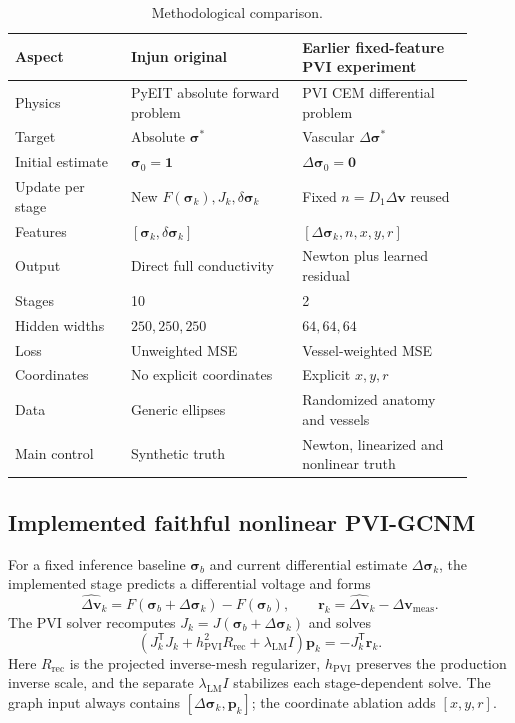 \documentclass[11pt]{article}
\newcommand{\trans}{^{\mathsf T}}
\newcommand{\sig}{\bm{\sigma}}
\newcommand{\dv}{\Delta\bm{v}}
\newcommand{\dsig}{\Delta\bm{\sigma}}
\begin{document}
\begin{table}[H]
\centering
\caption{Methodological comparison.}
\label{tab:method-comparison}
\small
\begin{tabular}{@{}p{0.23\linewidth}p{0.34\linewidth}p{0.34\linewidth}@{}}
\toprule
Aspect & Injun original & Earlier fixed-feature PVI experiment \\
\midrule
Physics & PyEIT absolute forward problem & PVI CEM differential problem \\
Target & Absolute $\sig^*$ & Vascular $\dsig^*$ \\
Initial estimate & $\sig_0=\bm1$ & $\dsig_0=\bm0$ \\
Update per stage & New $F(\sig_k),J_k,\delta\sig_k$ & Fixed $n=D_1\dv$ reused \\
Features & $[\sig_k,\delta\sig_k]$ & $[\dsig_k,n,x,y,r]$ \\
Output & Direct full conductivity & Newton plus learned residual \\
Stages & 10 & 2 \\
Hidden widths & $250,250,250$ & $64,64,64$ \\
Loss & Unweighted MSE & Vessel-weighted MSE \\
Coordinates & No explicit coordinates & Explicit $x,y,r$ \\
Data & Generic ellipses & Randomized anatomy and vessels \\
Main control & Synthetic truth & Newton, linearized and nonlinear truth \\
\bottomrule
\end{tabular}
\end{table}

\subsection{Implemented faithful nonlinear PVI-GCNM}
\label{sec:faithful-implementation}

For a fixed inference baseline $\sig_b$ and current differential estimate
$\dsig_k$, the implemented stage predicts a differential voltage and forms
\begin{equation}
  \widehat{\dv}_k=F(\sig_b+\dsig_k)-F(\sig_b),
  \qquad \bm r_k=\widehat{\dv}_k-\dv_{\mathrm{meas}}.
  \label{eq:implemented-residual}
\end{equation}
The PVI solver recomputes $J_k=J(\sig_b+\dsig_k)$ and solves
\begin{equation}
  \left(J_k\trans J_k+h_{\mathrm{PVI}}^2R_{\mathrm{rec}}
  +\lambda_{\mathrm{LM}}I\right)\bm p_k
  =-J_k\trans\bm r_k.
  \label{eq:implemented-lm}
\end{equation}
Here $R_{\mathrm{rec}}$ is the projected inverse-mesh regularizer,
$h_{\mathrm{PVI}}$ preserves the production inverse scale, and the separate
$\lambda_{\mathrm{LM}}I$ stabilizes each stage-dependent solve.  The graph input
always contains $[\dsig_k,\bm p_k]$; the coordinate ablation adds $[x,y,r]$.
\end{document}
